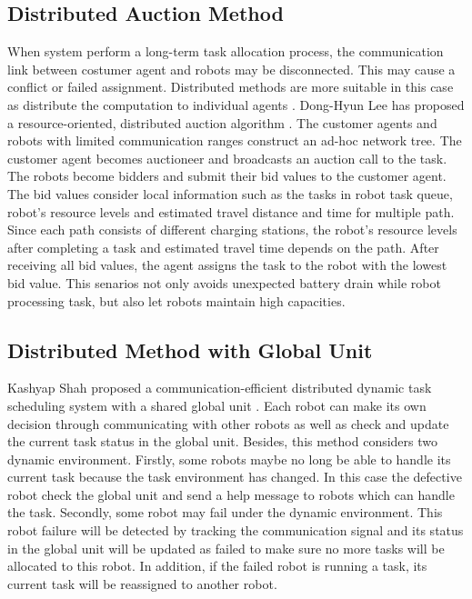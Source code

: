 \subsection{Distributed Auction Method}
\label{sec:auction_method}
When system perform a long-term task allocation process, the communication link between costumer agent and robots may be disconnected. This may cause a conflict or failed assignment. 
Distributed methods are more suitable in this case as distribute the computation to individual agents \cite{NUNES201755}. 
Dong-Hyun Lee has proposed a resource-oriented, distributed auction algorithm \cite{Dong2015}. The customer agents and robots with limited communication ranges construct an ad-hoc network tree. The customer agent becomes auctioneer and broadcasts an auction call to the task. The robots become bidders and submit their bid values to the customer agent. The bid values consider local information such as the tasks in robot task queue, robot's resource levels and estimated travel distance and time for multiple path. Since each path consists of different charging stations, the robot's resource levels after completing a task and estimated travel time depends on the path. After receiving all bid values, the agent assigns the task to the robot with the lowest bid value. This senarios not only avoids unexpected battery drain while robot processing task, but also let robots maintain high capacities. 

\subsection{Distributed Method with Global Unit}
\label{sec:global_unit_method}
Kashyap Shah proposed a communication-efficient distributed dynamic task scheduling system with a shared global unit \cite{Shah7}. Each robot can make its own decision through communicating with other robots as well as check and update the current task status in the global unit. Besides, this method considers two dynamic environment. 
Firstly, some robots maybe no long be able to handle its current task because the task environment has changed. In this case the defective robot check the global unit and send a help message to robots which can handle the task. Secondly, some robot may fail under the dynamic environment. This robot failure will be detected by tracking the communication signal and its status in the global unit will be updated as failed to make sure no more tasks will be allocated to this robot. In addition, if the failed robot is running a task, its current task will be reassigned to another robot. 


